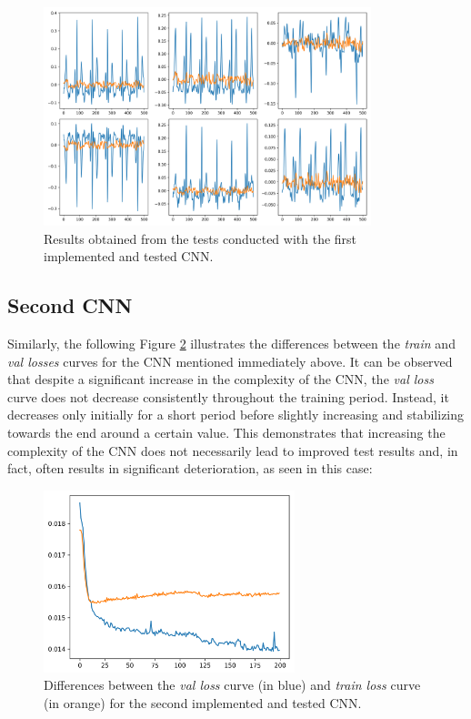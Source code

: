 \documentclass[12pt,english]{report}
\begin{document}
\begin{figure}[H]
    \centering
    \includegraphics[width=0.85\textwidth]{images/first_cnn_second_plot.png}
    \captionsetup{justification=centering}
    \caption{Results obtained from the tests conducted with the first implemented and tested CNN.}
    \label{fig:first_cnn_second_plot}
\end{figure}


\subsection{Second CNN}
\label{subsec:second_cnn_results}

Similarly, the following Figure \ref{fig:second_cnn_first_plot} illustrates the differences between the \textit{train} and \textit{val losses} curves for the CNN mentioned immediately above. It can be observed that despite a significant increase in the complexity of the CNN, the \textit{val loss} curve does not decrease consistently throughout the training period. Instead, it decreases only initially for a short period before slightly increasing and stabilizing towards the end around a certain value. This demonstrates that increasing the complexity of the CNN does not necessarily lead to improved test results and, in fact, often results in significant deterioration, as seen in this case:

\begin{figure}[H]
    \centering
    \includegraphics[width=0.65\textwidth]{images/second_cnn_first_plot.png}
    \captionsetup{justification=centering}
    \caption{Differences between the \textit{val loss} curve (in blue) and \textit{train loss} curve (in orange) for the second implemented and tested CNN.}
    \label{fig:second_cnn_first_plot}
\end{figure}
\end{document}

